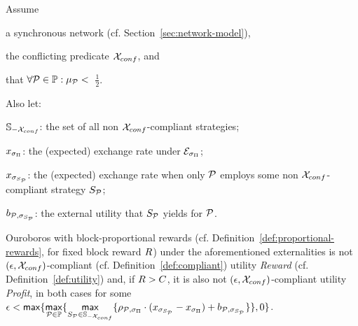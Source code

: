 \begin{theorem}\label{thm:external-ouroboros}
    Assume
    \begin{inparaenum}[i)]
        \item a synchronous network (cf. Section~\ref{sec:network-model}),
        \item the conflicting predicate $\mathcal{X}_{conf}$, and
        \item that $\forall \mathcal{P} \in \mathbb{P}: \mu_{\mathcal{P}} <$~$\frac{1}{2}$.
    \end{inparaenum}
    Also let:
    \begin{inparaenum}[i)]
        \item $\mathbb{S}_{-\mathcal{X}_{conf}}$: the set of all non $\mathcal{X}_{conf}$-compliant strategies;
        \item $x_{\sigma_\Pi}$: the (expected) exchange rate under $\mathcal{E}_{\sigma_\Pi}$;
        \item $x_{\sigma_{S_{\mathcal{P}}}}$: the (expected) exchange rate when only $\mathcal{P}$ employs some non $\mathcal{X}_{conf}$-compliant strategy $S_{\mathcal{P}}$;
        \item $b_{\mathcal{P}, \sigma_{S_{\mathcal{P}}}}$: the external utility that $S_{\mathcal{P}}$ yields for $\mathcal{P}$.
    \end{inparaenum}
    Ouroboros with block-proportional rewards (cf.
    Definition~\ref{def:proportional-rewards}, for fixed block reward $R$) under the aforementioned externalities is not $(\epsilon,
    \mathcal{X}_{conf})$-compliant (cf. Definition~\ref{def:compliant}) \wrt
    utility \emph{Reward} (cf. Definition~\ref{def:utility})
    and, if $R >
    C$, it is also not $(\epsilon, \mathcal{X}_{conf})$-compliant \wrt
    utility \emph{Profit}, in both cases
    for some
    $\epsilon < \mathsf{max}\{  \underset{\mathcal{P} \in \mathbb{P}}{\mathsf{max}}\{ \underset{S_{\mathcal{P}} \in \mathbb{S}_{-\mathcal{X}_{conf}}}{\mathsf{max}}\{ \rho_{\mathcal{P}, \sigma_{\Pi}} \cdot (x_{\sigma_{S_{\mathcal{P}}}} - x_{\sigma_\Pi}) + b_{\mathcal{P}, \sigma_{S_{\mathcal{P}}}} \} \}, 0 \}$.
\end{theorem}
